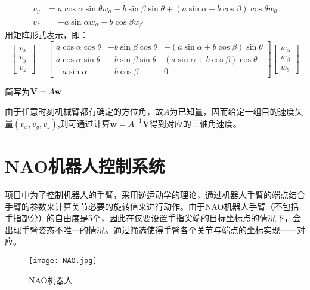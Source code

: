 	\begin{displaymath}
		\begin{aligned}
			{v_y} &= a\cos \alpha \sin \theta {w_\alpha } - b\sin \beta \sin \theta  + (a\sin \alpha  + b\cos \beta )\cos \theta {w_\theta }\\
			{v_z} &=  - a\sin \alpha {w_\alpha } - b\cos \beta {w_\beta }
		\end{aligned}
	\end{displaymath}
	用矩阵形式表示，即：
	\begin{displaymath}
		\left[ {\begin{array}{*{20}{c}}
				{{v_x}}\\
				{{v_y}}\\
				{{v_z}}
		\end{array}} \right] = \left[ {\begin{array}{*{20}{c}}
				{a\cos \alpha \cos \theta }&{ - b\sin \beta \cos \theta }&{ - (a\sin \alpha  + b\cos \beta )\sin \theta }\\
				{a\cos \alpha \sin \theta }&{ - b\sin \beta \sin \theta }&{(a\sin \alpha  + b\cos \beta )\cos \theta }\\
				{ - a\sin \alpha }&{ - b\cos \beta }&0
		\end{array}} \right]\left[ {\begin{array}{*{20}{c}}
				{{w_\alpha }}\\
				{{w_\beta }}\\
				{{w_\theta }}
		\end{array}} \right]
	\end{displaymath}
	
	简写为$\textbf {V}  = {A}\textbf w $
	
	由于任意时刻机械臂都有确定的方位角，故$A$为已知量，因而给定一组目的速度矢量$(v_x,v_y,v_z)$,则可通过计算$\textbf {w}=A^{-1}\textbf {V}$得到对应的三轴角速度。


\section{NAO机器人控制系统}
项目中为了控制机器人的手臂，采用逆运动学的理论，通过机器人手臂的端点结合手臂的参数来计算关节必要的旋转值来进行动作。由于NAO机器人手臂（不包括手指部分）的自由度是5个，因此在仅要设置手指尖端的目标坐标点的情况下，会出现手臂姿态不唯一的情况。通过筛选使得手臂各个关节与端点的坐标实现一一对应。

\begin{figure}[htbp]
\small
\centering
\texttt{[image: NAO.jpg]}
\caption{NAO机器人} 
\end{figure}

